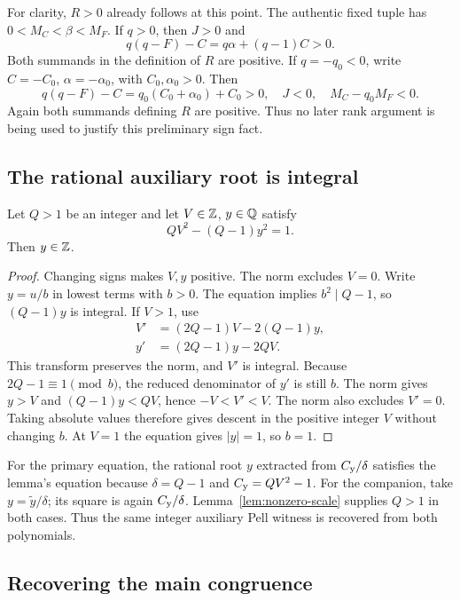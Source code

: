 For clarity, $R>0$ already follows at this point. The authentic fixed
tuple has $0<M_C<\beta<M_F$. If $q>0$, then $J>0$ and
\[
 q(q-F)-C=q\alpha+(q-1)C>0.
\]
Both summands in the definition of $R$ are positive. If $q=-q_0<0$,
write $C=-C_0$, $\alpha=-\alpha_0$, with $C_0,\alpha_0>0$.
Then
\[
 q(q-F)-C=q_0(C_0+\alpha_0)+C_0>0,
 \quad J<0,\quad M_C-q_0M_F<0.
\]
Again both summands defining $R$ are positive. Thus no later rank
argument is being used to justify this preliminary sign fact.

\subsection{The rational auxiliary root is integral}\label{sec:aux-integral}

\begin{lemma}\label{lem:adjacent-descent}
Let $Q>1$ be an integer and let $V\in\mathbb Z$, $y\in\mathbb Q$ satisfy
\[
 QV^2-(Q-1)y^2=1.
\]
Then $y\in\mathbb Z$.
\end{lemma}
\begin{proof}
Changing signs makes $V,y$ positive. The norm excludes $V=0$.
Write $y=u/b$ in lowest terms with $b>0$. The equation implies
$b^2\mid Q-1$, so $(Q-1)y$ is integral. If $V>1$, use
\begin{align*}
 V'&=(2Q-1)V-2(Q-1)y,\\
 y'&=(2Q-1)y-2QV.
\end{align*}
This transform preserves the norm, and $V'$ is integral. Because
$2Q-1\equiv1\pmod b$, the reduced denominator of $y'$ is still
$b$. The norm gives $y>V$ and $(Q-1)y<QV$, hence
$-V<V'<V$. The norm also excludes $V'=0$. Taking absolute values
therefore gives descent in the positive integer $V$ without changing
$b$. At $V=1$ the equation gives $|y|=1$, so $b=1$.
\end{proof}

For the primary equation, the rational root $y$ extracted from
$C_{\mathrm y}/\delta$ satisfies the lemma's equation because
$\delta=Q-1$ and $C_{\mathrm y}=QV^2-1$. For the companion, take
$y=\widetilde y/\delta$; its square is again $C_{\mathrm y}/\delta$.
Lemma~\ref{lem:nonzero-scale} supplies $Q>1$ in both cases. Thus the
same integer auxiliary Pell witness is recovered from both polynomials.

\subsection{Recovering the main congruence}

